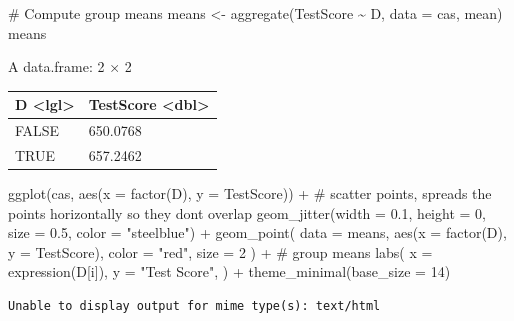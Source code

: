 \documentclass[
  12pt,
  letterpaper,
]{scrbook}
\newenvironment{Shaded}{\begin{snugshade}}{\end{snugshade}}
\newcommand{\AttributeTok}[1]{\textcolor[rgb]{0.40,0.45,0.13}{#1}}
\newcommand{\CommentTok}[1]{\textcolor[rgb]{0.37,0.37,0.37}{#1}}
\newcommand{\DecValTok}[1]{\textcolor[rgb]{0.68,0.00,0.00}{#1}}
\newcommand{\FloatTok}[1]{\textcolor[rgb]{0.68,0.00,0.00}{#1}}
\newcommand{\FunctionTok}[1]{\textcolor[rgb]{0.28,0.35,0.67}{#1}}
\newcommand{\NormalTok}[1]{\textcolor[rgb]{0.00,0.23,0.31}{#1}}
\newcommand{\OtherTok}[1]{\textcolor[rgb]{0.00,0.23,0.31}{#1}}
\newcommand{\SpecialCharTok}[1]{\textcolor[rgb]{0.37,0.37,0.37}{#1}}
\newcommand{\StringTok}[1]{\textcolor[rgb]{0.13,0.47,0.30}{#1}}
\theoremstyle{definition}
\theoremstyle{plain}
\theoremstyle{remark}
\begin{document}
\begin{Shaded}
\begin{Highlighting}[]
\CommentTok{\# Compute group means}
\NormalTok{means }\OtherTok{\textless{}{-}} \FunctionTok{aggregate}\NormalTok{(TestScore }\SpecialCharTok{\textasciitilde{}}\NormalTok{ D, }\AttributeTok{data =}\NormalTok{ cas, mean)}
\NormalTok{means}
\end{Highlighting}
\end{Shaded}

A data.frame: 2 × 2

\begin{longtable}[]{@{}ll@{}}
\toprule\noalign{}
D \textless lgl\textgreater{} & TestScore \textless dbl\textgreater{} \\
\midrule\noalign{}
\endhead
\bottomrule\noalign{}
\endlastfoot
FALSE & 650.0768 \\
TRUE & 657.2462 \\
\end{longtable}

\begin{Shaded}
\begin{Highlighting}[]
\FunctionTok{ggplot}\NormalTok{(cas, }\FunctionTok{aes}\NormalTok{(}\AttributeTok{x =} \FunctionTok{factor}\NormalTok{(D), }\AttributeTok{y =}\NormalTok{ TestScore)) }\SpecialCharTok{+}
    \CommentTok{\# scatter points, spreads the points horizontally so they don\textquotesingle{}t overlap}
    \FunctionTok{geom\_jitter}\NormalTok{(}\AttributeTok{width =} \FloatTok{0.1}\NormalTok{, }\AttributeTok{height =} \DecValTok{0}\NormalTok{, }\AttributeTok{size =} \FloatTok{0.5}\NormalTok{, }\AttributeTok{color =} \StringTok{"steelblue"}\NormalTok{) }\SpecialCharTok{+}
    \FunctionTok{geom\_point}\NormalTok{(}
        \AttributeTok{data =}\NormalTok{ means, }\FunctionTok{aes}\NormalTok{(}\AttributeTok{x =} \FunctionTok{factor}\NormalTok{(D), }\AttributeTok{y =}\NormalTok{ TestScore),}
        \AttributeTok{color =} \StringTok{"red"}\NormalTok{, }\AttributeTok{size =} \DecValTok{2}
\NormalTok{    ) }\SpecialCharTok{+} \CommentTok{\# group means}
    \FunctionTok{labs}\NormalTok{(}
        \AttributeTok{x =} \FunctionTok{expression}\NormalTok{(D[i]),}
        \AttributeTok{y =} \StringTok{"Test Score"}\NormalTok{,}
\NormalTok{    ) }\SpecialCharTok{+}
    \FunctionTok{theme\_minimal}\NormalTok{(}\AttributeTok{base\_size =} \DecValTok{14}\NormalTok{)}
\end{Highlighting}
\end{Shaded}

\begin{verbatim}
Unable to display output for mime type(s): text/html
\end{verbatim}
\end{document}
